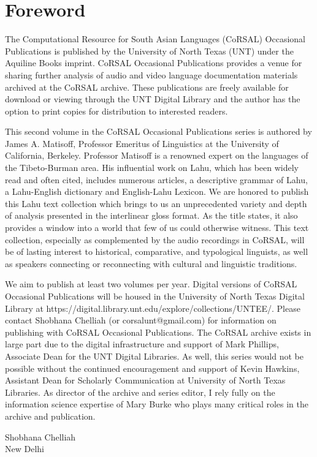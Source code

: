 \thispagestyle{empty}
\renewcommand{\thefootnote}{\arabic{footnote}}
\setcounter{footnote}{0}

\section*{Foreword}
The Computational Resource for South Asian Languages (CoRSAL)
Occasional Publications is published by the University of North Texas
(UNT) under the Aquiline Books imprint. CoRSAL Occasional Publications
provides a venue for sharing further analysis of audio and video
language documentation materials archived at the CoRSAL archive.
These publications are freely available for download or viewing
through the UNT Digital Library and the author has the option to print
copies for distribution to interested readers.

This second volume in the CoRSAL Occasional Publications series is
authored by James A. Matisoff, Professor Emeritus of Linguistics at
the University of California, Berkeley. Professor Matisoff is a
renowned expert on the languages of the Tibeto-Burman area.  His
influential work on Lahu, which has been widely read and often cited,
includes numerous articles, a descriptive grammar of Lahu, a
Lahu-English dictionary and English-Lahu Lexicon.  We are honored to
publish this Lahu text collection which brings to us an unprecedented
variety and depth of analysis presented in the interlinear gloss
format.  As the title states, it also provides a window into a world
that few of us could otherwise witness.  This text collection,
especially as complemented by the audio recordings in CoRSAL, will be
of lasting interest to historical, comparative, and typological
linguists, as well as speakers connecting or reconnecting with
cultural and linguistic traditions.

We aim to publish at least two volumes per year. Digital versions of
CoRSAL Occasional Publications will be housed in the University of
North Texas Digital Library at
https://digital.library.unt.edu/explore/collections/UNTEE/.  Please
contact Shobhana Chelliah (or corsalunt@gmail.com) for information on
publishing with CoRSAL Occasional Publications.  The CoRSAL archive
exists in large part due to the digital infrastructure and support of
Mark Phillips, Associate Dean for the UNT Digital Libraries.  As well,
this series would not be possible without the continued encouragement
and support of Kevin Hawkins, Assistant Dean for Scholarly
Communication at University of North Texas Libraries.  As director of
the archive and series editor, I rely fully on the information science
expertise of Mary Burke who plays many critical roles in the archive
and publication.

\vspace{4cm}
Shobhana Chelliah\\
New Delhi